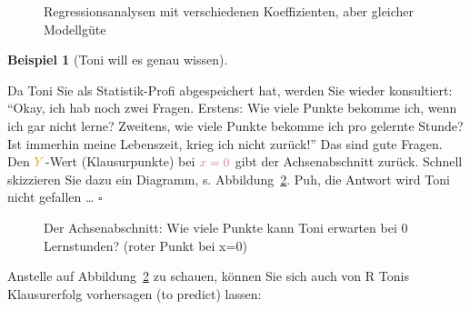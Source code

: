 \documentclass[
  letterpaper,
  twoside,
  open=any]{scrbook}
\theoremstyle{definition}
\theoremstyle{definition}
\theoremstyle{definition}
\newtheorem{example}{Beispiel}[chapter]
\theoremstyle{remark}
\begin{document}
\begin{figure}
\begin{minipage}{0.50\linewidth}
{}


\end{minipage}%

\caption{\label{fig-regr-div}Regressionsanalysen mit verschiedenen
Koeffizienten, aber gleicher Modellgüte}

\end{figure}%

\begin{example}[Toni will es genau
wissen]\protect\hypertarget{exm-noten5}{}\label{exm-noten5}

Da Toni Sie als Statistik-Profi abgespeichert hat, werden Sie wieder
konsultiert: \enquote{Okay, ich hab noch zwei Fragen. Erstens: Wie viele
Punkte bekomme ich, wenn ich gar nicht lerne? Zweitens, wie viele Punkte
bekomme ich pro gelernte Stunde? Ist immerhin meine Lebenszeit, krieg
ich nicht zurück!} {Das sind gute Fragen. Den \(\color{ycol}{Y}\)-Wert
(Klausurpunkte) bei \(\color{xcol}{x}=0\) gibt der Achsenabschnitt
zurück.} Schnell skizzieren Sie dazu ein Diagramm, s.
Abbildung~\ref{fig-beta0}. Puh, die Antwort wird Toni nicht gefallen
\ldots{} \(\square\)

\end{example}

\begin{figure}


\caption{\label{fig-beta0}Der Achsenabschnitt: Wie viele Punkte kann
Toni erwarten bei 0 Lernstunden? (roter Punkt bei x=0)}

\end{figure}%

Anstelle auf Abbildung~\ref{fig-beta0} zu schauen, können Sie sich auch
von R Tonis Klausurerfolg vorhersagen (to predict) lassen:
\end{document}
